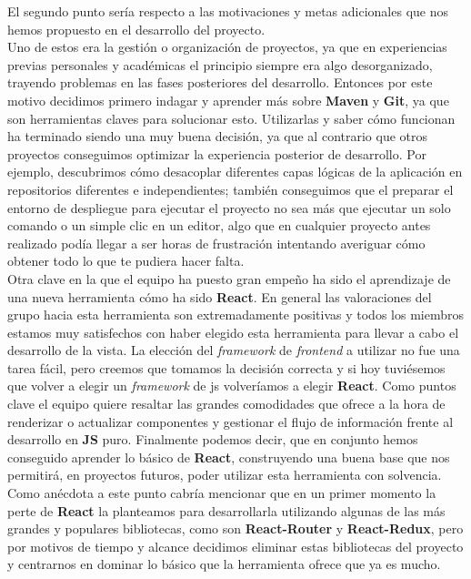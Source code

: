 \documentclass[../ei103948-project-documentation.tex]{subfiles}
\begin{document}
        El segundo punto sería respecto a las motivaciones y metas adicionales que nos hemos propuesto en el desarrollo del proyecto.\\

        Uno de estos era la gestión o organización de proyectos, ya que en experiencias previas personales y académicas el principio siempre era algo desorganizado, trayendo problemas en las fases posteriores del desarrollo. Entonces por este motivo decidimos primero indagar y aprender más sobre \textbf{Maven} y \textbf{Git}, ya que son herramientas claves para solucionar esto. Utilizarlas y saber cómo funcionan ha terminado siendo una muy buena decisión, ya que al contrario que otros proyectos conseguimos optimizar la experiencia posterior de desarrollo. Por ejemplo, descubrimos cómo desacoplar diferentes capas lógicas de la aplicación en repositorios diferentes e independientes; también conseguimos que el preparar el entorno de despliegue para ejecutar el proyecto no sea más que ejecutar un solo comando o un simple clic en un editor, algo que en cualquier proyecto antes realizado podía llegar a ser horas de frustración intentando averiguar cómo obtener todo lo que te pudiera hacer falta.\\

        Otra clave en la que el equipo ha puesto gran empeño ha sido el aprendizaje de una nueva herramienta cómo ha sido \textbf{React}. En general las valoraciones del grupo hacia esta herramienta son extremadamente positivas y todos los miembros estamos muy satisfechos con haber elegido esta herramienta para llevar a cabo el desarrollo de la vista. La elección del \textit{framework} de \textit{frontend} a utilizar no fue una tarea fácil, pero creemos que tomamos la decisión correcta y si hoy tuviésemos que volver a elegir un \textit{framework} de js volveríamos a elegir \textbf{React}. Como puntos clave el equipo quiere resaltar las grandes comodidades que ofrece a la hora de renderizar o actualizar componentes y gestionar el flujo de información frente al desarrollo en \textbf{JS} puro. Finalmente podemos decir, que en conjunto hemos conseguido aprender lo básico de \textbf{React}, construyendo una buena base que nos permitirá, en proyectos futuros, poder utilizar esta herramienta con solvencia. Como anécdota a este punto cabría mencionar que en un primer momento la perte de \textbf{React} la planteamos para desarrollarla utilizando algunas de las más grandes y populares bibliotecas, como son \textbf{React-Router} y \textbf{React-Redux}, pero por motivos de tiempo y alcance decidimos eliminar estas bibliotecas del proyecto y centrarnos en dominar lo básico que la herramienta ofrece que ya es mucho.\\
\end{document}
